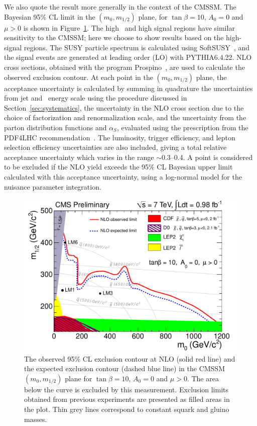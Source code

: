 We also quote the result more generally in the context of the CMSSM.
The Bayesian 95\% CL limit  in the  $(m_0,m_{1/2})$ plane,  for $\tan\beta=10$,
$A_0 = 0$ and $\mu > 0$ is shown in Figure~\ref{fig:msugra}. 
The high \met\ and high \Ht signal regions have similar sensitivity to the CMSSM; 
here we choose to show results based on the high-\Ht signal regions. The
SUSY particle  spectrum is calculated using  SoftSUSY~\cite{Allanach:2002uq}, and the
signal  events  are  generated  at  leading  order  (LO)  with  PYTHIA6.4.22.
NLO  cross sections,  obtained  with the
program  Prospino~\cite{Beenakker:1997kx},  are used  to  calculate  the observed
exclusion  contour.  
At each point in the  $(m_0,m_{1/2})$ plane, the acceptance uncertainty is calculated by
summing in quadrature the uncertainties from jet and \met\ energy scale using the
procedure discussed in Section~\ref{sec:systematics}, the uncertainty in the 
NLO cross section due to the choice of factorization and renormalization scale, 
and the uncertainty from the parton distribution functions and $\alpha_{S}$,
evaluated using the prescription from the PDF4LHC recommendation~\cite{PDF4LHC}.
The luminosity, trigger efficiency, and lepton selection efficiency uncertainties are also 
included, giving a total relative acceptance uncertainty which varies in the range $\sim$0.3--0.4.
A point is considered to be excluded if the NLO yield exceeds the 95\% CL
Bayesian upper limit calculated with this acceptance uncertainty, using
a log-normal model for the nuisance parameter integration.


\begin{figure}[tbh]
\begin{center}
\includegraphics[width=1\linewidth]{plots/RA6_ExclusionLimit_tanb10.pdf}
\caption{\label{fig:msugra}\protect 
The observed 95\% CL exclusion contour at NLO (solid red line) and the expected exclusion contour (dashed blue line) 
in the CMSSM $(m_0,m_{1/2})$ plane for  $\tan\beta=10$, $A_0 = 0$ and $\mu > 0$. 
The area below the curve is excluded by this measurement. Exclusion limits obtained from 
previous experiments are presented as filled areas in the plot. Thin grey lines correspond to 
constant squark and gluino masses.}
\end{center}
\end{figure}

